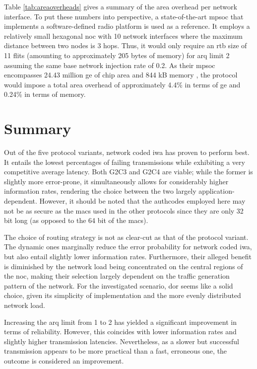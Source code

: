 \vspace{0.5\baselineskip}
Table \vref{tab:areaoverheads} gives a summary of the area overhead per network interface. To put these numbers into perspective, a state-of-the-art
\gls{mpsoc} that implements a software-defined radio platform \cite{haas18sdrmpsoc} is used as a reference. It employs a relatively small hexagonal
\gls{noc} with 10 network interfaces where the maximum distance between two nodes is 3 hops. Thus, it would only require an \gls{rtb} size of 11 flits
(amounting to approximately 205 bytes of memory) for \gls{arq} limit 2 assuming the same base network injection rate of 0.2. As their \gls{mpsoc} encompasses 24.43
million \gls{ge} of chip area and 844 kB memory \cite[4]{haas18sdrmpsoc}, the protocol would impose a total area overhead of approximately 4.4\% in
terms of \gls{ge} and 0.24\% in terms of memory.

\section{Summary}\label{sec:summaryeval}
Out of the five protocol variants, network coded \gls{iwa} has proven to perform best. It entails the lowest percentages of failing
transmissions while exhibiting a very competitive average latency. Both G2C3 and G2C4 are viable; while the former is slightly more error-prone, it
simultaneously allows for considerably higher information rates, rendering the choice between the two largely application-dependent. However, it
should be noted that the authcodes employed here may not be as secure as the \glspl{mac} used in the other protocols since they are only 32 bit long
(as opposed to the 64 bit of the \glspl{mac}).

The choice of routing strategy is not as clear-cut as that of the protocol variant. The dynamic ones marginally reduce the error probability for
network coded \gls{iwa}, but also entail slightly lower information rates. Furthermore, their alleged benefit is diminished by the network load being
concentrated on the central regions of the \gls{noc}, making their selection largely dependent on the traffic generation pattern of the network. For the
investigated scenario, \gls{dor} seems like a solid choice, given its simplicity of implementation and the more evenly distributed network load.

Increasing the \gls{arq} limit from 1 to 2 has yielded a significant improvement in terms of reliability. However, this coincides with lower
information rates and slightly higher transmission latencies. Nevertheless, as a slower but successful transmission appears to be more practical than
a fast, erroneous one, the outcome is considered an improvement.

